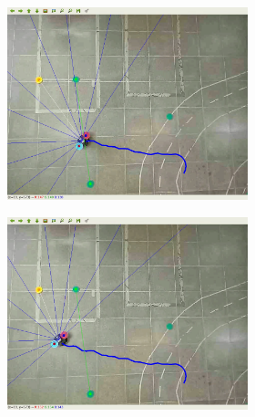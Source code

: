 \begin{figure}[H]
\begin{center}
\begin{subfigure}[b]{0.60\textwidth}
        \begin{subfigure}[b]{0.24\textwidth}
            \includegraphics[width=\textwidth]{imagens/real_envs/real_env1_sac/5.png}
        \end{subfigure}
        \hfill
        \begin{subfigure}[b]{0.24\textwidth}
            \includegraphics[width=\textwidth]{imagens/real_envs/real_env1_sac/6.png}
        \end{subfigure}
        \hfill
        \begin{subfigure}[b]{0.24\textwidth}

\end{subfigure}
\end{subfigure}
\end{center}
\end{figure}
